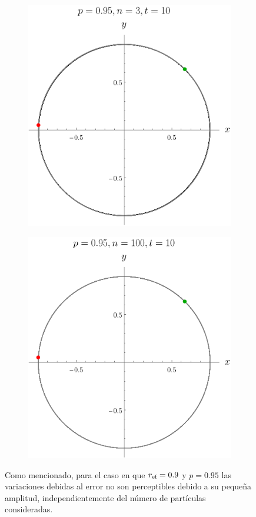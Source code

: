 \begin{figure}[ht!]
    \centering
    \begin{subfigure}{0.5\textwidth}
      \centering
      \includegraphics[width=0.9\linewidth]{chapter3/figures_separable/local_Z_evol_n=3_p=0.95_from_-3_to_3_end=10.png}
    \end{subfigure}%
    \begin{subfigure}{0.5\textwidth}
      \centering
      \includegraphics[width=0.9\linewidth]{chapter3/figures_separable/local_Z_evol_n=100_p=0.95_from_-3_to_3_end=10.png}
    \end{subfigure}
    \caption{Como mencionado, para el caso en que $r_{\text{ef}}=0.9$ y $p=0.95$ las variaciones debidas al error no son perceptibles debido a su pequeña amplitud, independientemente del número de partículas consideradas.}\label{fig:Oscilations12}
\end{figure}
